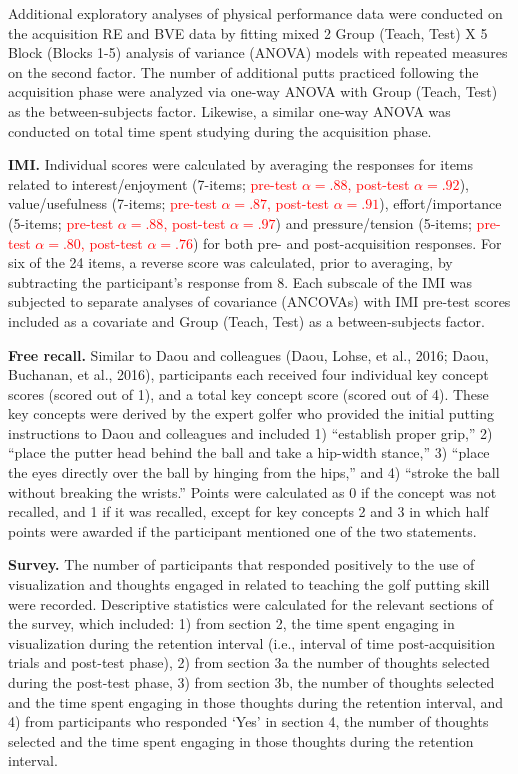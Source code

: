 \documentclass[
  english,
  man,floatsintext]{apa7}
\begin{document}
Additional exploratory analyses of physical performance data were conducted on the acquisition RE and BVE data by fitting mixed 2 Group (Teach, Test) X 5 Block (Blocks 1-5) analysis of variance (ANOVA) models with repeated measures on the second factor. The number of additional putts practiced following the acquisition phase were analyzed via one-way ANOVA with Group (Teach, Test) as the between-subjects factor. Likewise, a similar one-way ANOVA was conducted on total time spent studying during the acquisition phase.

\textbf{IMI.} Individual scores were calculated by averaging the responses for items related to interest/enjoyment (7-items; \textcolor{red}{pre-test $\alpha = .88$, post-test $\alpha = .92$}), value/usefulness (7-items; \textcolor{red}{pre-test $\alpha = .87$, post-test $\alpha = .91$}), effort/importance (5-items; \textcolor{red}{pre-test $\alpha = .88$, post-test $\alpha = .97$}) and pressure/tension (5-items; \textcolor{red}{pre-test $\alpha = .80$, post-test $\alpha = .76$}) for both pre- and post-acquisition responses. For six of the 24 items, a reverse score was calculated, prior to averaging, by subtracting the participant's response from 8. Each subscale of the IMI was subjected to separate analyses of covariance (ANCOVAs) with IMI pre-test scores included as a covariate and Group (Teach, Test) as a between-subjects factor.

\textbf{Free recall.} Similar to Daou and colleagues (Daou, Lohse, et al., 2016; Daou, Buchanan, et al., 2016), participants each received four individual key concept scores (scored out of 1), and a total key concept score (scored out of 4). These key concepts were derived by the expert golfer who provided the initial putting instructions to Daou and colleagues and included 1) ``establish proper grip,'' 2) ``place the putter head behind the ball and take a hip-width stance,'' 3) ``place the eyes directly over the ball by hinging from the hips,'' and 4) ``stroke the ball without breaking the wrists.'' Points were calculated as 0 if the concept was not recalled, and 1 if it was recalled, except for key concepts 2 and 3 in which half points were awarded if the participant mentioned one of the two statements.

\textbf{Survey.} The number of participants that responded positively to the use of visualization and thoughts engaged in related to teaching the golf putting skill were recorded. Descriptive statistics were calculated for the relevant sections of the survey, which included: 1) from section 2, the time spent engaging in visualization during the retention interval (i.e., interval of time post-acquisition trials and post-test phase), 2) from section 3a the number of thoughts selected during the post-test phase, 3) from section 3b, the number of thoughts selected and the time spent engaging in those thoughts during the retention interval, and 4) from participants who responded `Yes' in section 4, the number of thoughts selected and the time spent engaging in those thoughts during the retention interval.
\end{document}
